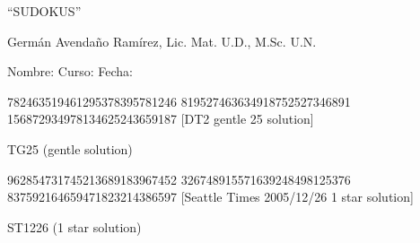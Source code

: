 \documentclass{article}
\begin{document}
\begin{center}
\large ``SUDOKUS''
\end{center}
\begin{center}
Germ\'an Avenda\~no Ram\'irez, Lic. Mat. U.D., M.Sc. U.N.
\end{center}
Nombre: \hrulefill Curso: \underline{\hspace*{44pt}} Fecha: \underline{\hspace*{2.5cm}}
\cluefont{\Large}

\begin{center}
\renewcommand*{\puzzlefile}{tg25.ans}
\writepuzzle%
{782463519}{461295378}{395781246}%
{819527463}{634918752}{527346891}%
{156872934}{978134625}{243659187}%
[DT2 gentle 25 solution]
\vfill
\noindent\begin{minipage}{0.47\linewidth}\begin{center}
TG25 (gentle solution) \\
\end{center}\end{minipage}
\end{center}

\begin{center}
\renewcommand*{\puzzlefile}{st1226.ans}
\writepuzzle%
{962854731}{745213689}{183967452}%
{326748915}{571639248}{498125376}%
{837592164}{659471823}{214386597}%
[Seattle Times 2005/12/26 1 star solution]
\vfill
\noindent\begin{minipage}{0.47\linewidth}\begin{center}
ST1226 (1 star solution) \\
\end{center}\end{minipage}
\end{center}
\end{document}
